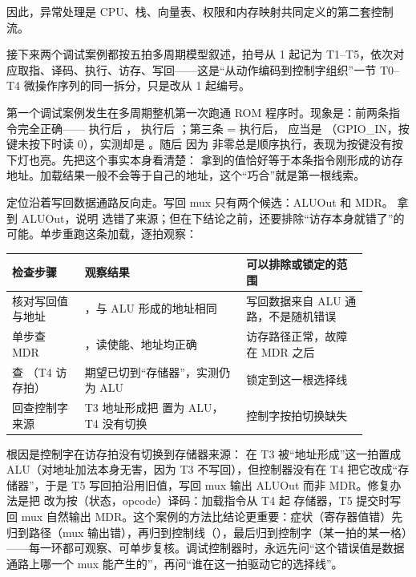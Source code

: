 因此，异常处理是 CPU、栈、向量表、权限和内存映射共同定义的第二套控制流。

接下来两个调试案例都按五拍多周期模型叙述，拍号从 1 起记为 T1–T5，依次对应取指、译码、执行、访存、写回——这是“从动作编码到控制字组织”一节 T0–T4 微操作序列的同一拆分，只是改从 1 起编号。

第一个调试案例发生在多周期整机第一次跑通 ROM 程序时。现象是：前两条指令完全正确—— 执行后 ， 执行后 ；第三条 = 执行后， 应当是 （GPIO\_IN，按键未按下时读 0），实测却是 。随后  因为  非零总是顺序执行，表现为按键没有按下灯也亮。先把这个事实本身看清楚： 拿到的值恰好等于本条指令刚形成的访存地址。加载结果一般不会等于自己的地址，这个“巧合”就是第一根线索。

定位沿着写回数据通路反向走。写回 mux 只有两个候选：ALUOut 和 MDR。 拿到 ALUOut，说明  选错了来源；但在下结论之前，还要排除“访存本身就错了”的可能。单步重跑这条加载，逐拍观察：

\begin{longtable}{L{0.18\linewidth}L{0.4\linewidth}L{0.3\linewidth}}
\toprule
检查步骤 & 观察结果 & 可以排除或锁定的范围 \\
\midrule
核对写回值与地址 & ，与 ALU 形成的地址相同 & 写回数据来自 ALU 通路，不是随机错误 \\\tablerowrule
单步查 MDR & ，读使能、地址均正确 & 访存路径正常，故障在 MDR 之后 \\\tablerowrule
查 （T4 访存拍） & 期望已切到“存储器”，实测仍为 ALU & 锁定到这一根选择线 \\\tablerowrule
回查控制字来源 & T3 地址形成把  置为 ALU，T4 没有切换 & 控制字按拍切换缺失 \\
\bottomrule
\end{longtable}

根因是控制字在访存拍没有切换到存储器来源： 在 T3 被“地址形成”这一拍置成 ALU（对地址加法本身无害，因为 T3 不写回），但控制器没有在 T4 把它改成“存储器”，于是 T5 写回拍沿用旧值，写回 mux 输出 ALUOut 而非 MDR。修复办法是把  改为按（状态，opcode）译码：加载指令从 T4 起  存储器，T5 提交时写回 mux 自然输出 MDR。这个案例的方法比结论更重要：症状（寄存器值错）先归到路径（mux 输出错），再归到控制线（），最后归到控制字（某一拍的某一格）——每一环都可观察、可单步复核。调试控制器时，永远先问“这个错误值是数据通路上哪一个 mux 能产生的”，再问“谁在这一拍驱动它的选择线”。

